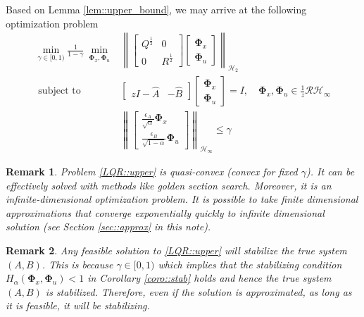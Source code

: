 \documentclass{article}[12pt]
\newtheorem{remark}{Remark}
\begin{document}
Based on Lemma \ref{lem::upper_bound}, we may arrive at the following optimization problem
\begin{equation}
\label{LQR::upper}
\begin{array}{ll}{\operatorname{min}_{\gamma \in {[0,1)}} \frac{1}{1-\gamma} \ \min _{\mathbf{\Phi}_x,\mathbf{\Phi}_u} } & {\left\|\left[\begin{array}{cc}{Q^{\frac{1}{2}}} & {0} \\ {0} & {R^{\frac{1}{2}}}\end{array}\right]\left[\begin{array}{l}{\mathbf{\Phi}_{x}} \\ {\mathbf{\Phi}_{u}}\end{array}\right]\right\|_{\mathcal{H}_{2}}}
\\ 
{\text { subject to }} & {\left[\begin{array}{cc}{z I-\widehat{A}} & {-\widehat{B}}\end{array}\right]\left[\begin{array}{c}{\mathbf{\Phi}_{x}} \\ {\mathbf{\Phi}_{u}}\end{array}\right]=I, \quad \mathbf{\Phi}_{x}, \mathbf{\Phi}_{u} \in \frac{1}{z} \mathcal{R} \mathcal{H}_{\infty}} \\ &\left\|\left[\begin{array}{c}{\frac{\epsilon_{A}}{\sqrt{\alpha}} \mathbf{\Phi}_{x}} \\ {\frac{\epsilon_{B}}{\sqrt{1-\alpha}} \mathbf{\Phi}_{u}}\end{array}\right]\right\|_{\mathcal{H}_{\infty}} \leq \gamma
\end{array}
\end{equation}

\begin{remark}
Problem \eqref{LQR::upper} is quasi-convex (convex for fixed $\gamma$). It can be effectively solved with methods like golden section search.
Moreover, it is an infinite-dimensional optimization problem. 
It is possible to take finite dimensional approximations that converge exponentially quickly to infinite dimensional solution (see Section \ref{sec::approx} in this note).
\end{remark}

\begin{remark}
Any feasible solution to \eqref{LQR::upper} will stabilize the true system $(A,B)$. This is because $\gamma \in[0,1)$ which implies that the stabilizing condition $H_{\alpha}\left(\mathbf{\Phi}_{x}, \mathbf{\Phi}_{u}\right)<1$ in Corollary \ref{coro::stab} holds and hence the true system $(A,B)$ is stabilized.
Therefore, even if the solution is approximated, as long as
it is feasible, it will be stabilizing.
\end{remark}
\end{document}
